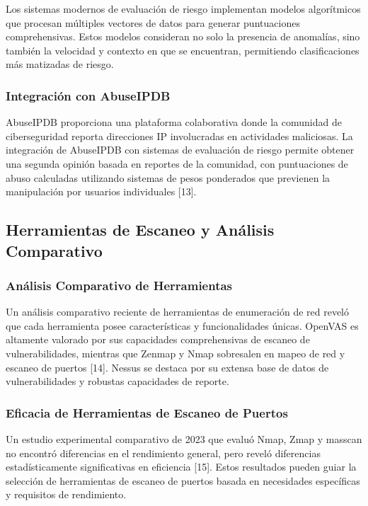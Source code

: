 Los sistemas modernos de evaluación de riesgo implementan modelos algorítmicos que procesan múltiples vectores de datos para generar puntuaciones comprehensivas. Estos modelos consideran no solo la presencia de anomalías, sino también la velocidad y contexto en que se encuentran, permitiendo clasificaciones más matizadas de riesgo.

\subsubsection{Integración con AbuseIPDB}

AbuseIPDB proporciona una plataforma colaborativa donde la comunidad de ciberseguridad reporta direcciones IP involucradas en actividades maliciosas. La integración de AbuseIPDB con sistemas de evaluación de riesgo permite obtener una segunda opinión basada en reportes de la comunidad, con puntuaciones de abuso calculadas utilizando sistemas de pesos ponderados que previenen la manipulación por usuarios individuales [13].

\subsection{Herramientas de Escaneo y Análisis Comparativo}

\subsubsection{Análisis Comparativo de Herramientas}

Un análisis comparativo reciente de herramientas de enumeración de red reveló que cada herramienta posee características y funcionalidades únicas. OpenVAS es altamente valorado por sus capacidades comprehensivas de escaneo de vulnerabilidades, mientras que Zenmap y Nmap sobresalen en mapeo de red y escaneo de puertos [14]. Nessus se destaca por su extensa base de datos de vulnerabilidades y robustas capacidades de reporte.

\subsubsection{Eficacia de Herramientas de Escaneo de Puertos}

Un estudio experimental comparativo de 2023 que evaluó Nmap, Zmap y masscan no encontró diferencias en el rendimiento general, pero reveló diferencias estadísticamente significativas en eficiencia [15]. Estos resultados pueden guiar la selección de herramientas de escaneo de puertos basada en necesidades específicas y requisitos de rendimiento.

